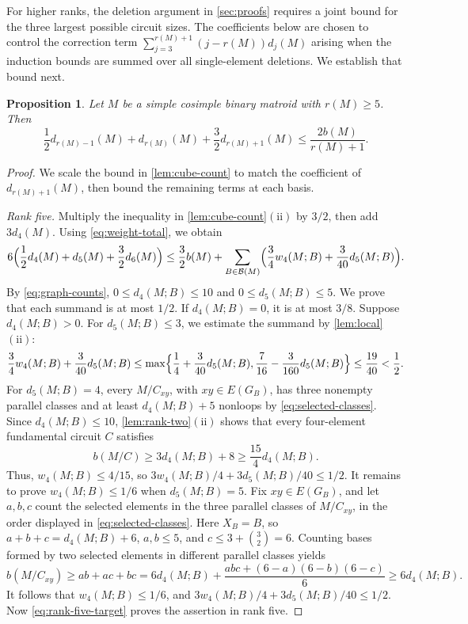 \documentclass[11pt]{article}
\numberwithin{equation}{section}
\newtheorem{proposition}[proposition]{Proposition}
\newcommand{\BB}{\mathcal B}
\newcommand{\wloc}[1]{w_{#1}(M;B)}
\newcommand{\dloc}[1]{d_{#1}(M;B)}
\begin{document}
For higher ranks, the deletion argument in \autoref{sec:proofs}
requires a joint bound for the three largest possible circuit sizes.
The coefficients below are chosen to control the correction term
\(\sum_{j=3}^{r(M)+1}(j-r(M))d_j(M)\) arising when the induction
bounds are summed over all single-element deletions.
We establish that bound next.
\begin{proposition}\label{prop:joint}
Let \(M\) be a simple cosimple binary matroid with \(r(M)\ge5\). Then
\[
 \frac12d_{r(M)-1}(M)+d_{r(M)}(M)+\frac32d_{r(M)+1}(M)
 \le\frac{2b(M)}{r(M)+1}.
\]
\end{proposition}
\begin{proof}
We scale the bound in \autoref{lem:cube-count} to match the coefficient of
\(d_{r(M)+1}(M)\), then bound the remaining terms at each basis.

\emph{Rank five.}
Multiply the inequality in \autoref{lem:cube-count}\(\mathrm{(ii)}\)
by \(3/2\), then add \(3d_4(M)\). Using \eqref{eq:weight-total}, we obtain
\begin{equation}
 6\Bigl(\frac12d_4(M)+d_5(M)+\frac32d_6(M)\Bigr)\le\frac32b(M)+\sum_{B\in\BB(M)}
 \Bigl(\frac34\wloc4+\frac3{40}\dloc5\Bigr).
 \label{eq:rank-five-target}
\end{equation}
By \eqref{eq:graph-counts}, \(0\le\dloc4\le10\) and \(0\le\dloc5\le5\).
We prove that each summand is at most \(1/2\).
If \(\dloc4=0\), it is at most \(3/8\).
Suppose \(\dloc4>0\).
For \(\dloc5\le3\), we estimate the summand by \autoref{lem:local}\(\mathrm{(ii)}\):
\[
 \frac34\wloc4+\frac3{40}\dloc5
 \le\max\Bigl\{\frac14+\frac3{40}\dloc5,
 \frac7{16}-\frac3{160}\dloc5\Bigr\}
 \le\frac{19}{40}<\frac12.
\]
For \(\dloc5=4\), every \(M/C_{xy}\), with \(xy\in E(G_B)\),
has three nonempty parallel classes and at least \(\dloc4+5\) nonloops
by \eqref{eq:selected-classes}.
Since \(\dloc4\le10\),
\autoref{lem:rank-two}\(\mathrm{(ii)}\) shows that
every four-element fundamental circuit \(C\) satisfies
\[
 b(M/C)\ge3\dloc4+8\ge\frac{15}4\dloc4.
\]
Thus, \(\wloc4\le4/15\), so
\(3\wloc4/4+3\dloc5/40\le1/2\). It remains to prove \(\wloc4\le1/6\) when \(\dloc5=5\).
Fix \(xy\in E(G_B)\), and let \(a,b,c\)
count the selected elements in the three parallel classes of
\(M/C_{xy}\), in the order displayed in \eqref{eq:selected-classes}.
Here \(X_B=B\), so \(a+b+c=\dloc4+6\),
\(a,b\le5\), and \(c\le3+\binom32=6\).
Counting bases formed by two selected elements in different
parallel classes yields
\[
 b(M/C_{xy})\ge ab+ac+bc
 =6\dloc4+\frac{abc+(6-a)(6-b)(6-c)}6
 \ge6\dloc4.
\]
It follows that \(\wloc4\le1/6\), and
\(3\wloc4/4+3\dloc5/40\le1/2\).
Now \eqref{eq:rank-five-target} proves the assertion in rank five.


\end{proof}
\end{document}
